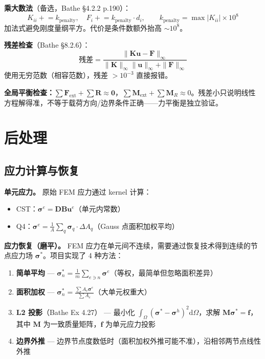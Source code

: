 \documentclass[12pt,a4paper]{ctexart}
\begin{document}
\textbf{乘大数法}（备选，Bathe \S4.2.2 p.190）：
\begin{equation*}
K_{ii} \mathrel{+}= k_{\text{penalty}},\quad F_i \mathrel{+}= k_{\text{penalty}}\cdot d_i,\qquad
k_{\text{penalty}} = \max|K_{ii}| \times 10^8
\end{equation*}
加法式避免刚度量纲平方。代价是条件数额外抬高 $\sim 10^8$。

\textbf{残差检查}（Bathe \S8.2.6）：
\begin{equation*}
\text{残差} = \frac{\|\mathbf{K}\mathbf{u} - \mathbf{F}\|_\infty}
{\|\mathbf{K}\|_\infty\|\mathbf{u}\|_\infty + \|\mathbf{F}\|_\infty}
\end{equation*}
使用无穷范数（相容范数），残差 $> 10^{-3}$ 直接报错。

\textbf{全局平衡检查：}$\sum\mathbf{F}_{\text{ext}} + \sum\mathbf{R} \approx \mathbf{0}$，$\sum\mathbf{M}_{\text{ext}} + \sum\mathbf{M}_R \approx 0$。残差小只说明线性方程解得准，不等于载荷方向/边界条件正确——力平衡是独立验证。

\section{后处理}

\subsection{应力计算与恢复}

\textbf{单元应力。} 原始 FEM 应力通过 kernel 计算：
\begin{itemize}
  \item CST：$\bm{\sigma}^e = \mathbf{D}\mathbf{B}\mathbf{u}^e$（单元内常数）
  \item Q4：$\bm{\sigma}^e = \frac{1}{A}\sum_q \bm{\sigma}_q\cdot\Delta A_q$（Gauss 点面积加权平均）
\end{itemize}

\textbf{应力恢复（磨平）。} FEM 应力在单元间不连续，需要通过恢复技术得到连续的节点应力场 $\bm{\sigma}^*$。项目实现了 4 种方法：

\begin{enumerate}[leftmargin=*]
  \item \textbf{简单平均} — $\bm{\sigma}^*_n = \frac{1}{m}\sum_{e\ni n}\bm{\sigma}^e$（等权，最简单但忽略面积差异）
  \item \textbf{面积加权} — $\bm{\sigma}^*_n = \frac{\sum A_e\bm{\sigma}^e}{\sum A_e}$（大单元权重大）
  \item \textbf{L2 投影}（Bathe Ex 4.27） — 最小化 $\int_\Omega (\bm{\sigma}^* - \bm{\sigma}^h)^2\mathrm{d}\Omega$，求解 $\mathbf{M}\bm{\sigma}^* = \mathbf{f}$，其中 $\mathbf{M}$ 为一致质量矩阵，$\mathbf{f}$ 为单元应力投影
  \item \textbf{边界外推} — 边界节点度数低时（面积加权外推可能不准），沿相邻两节点线性外推
\end{enumerate}
\end{document}
